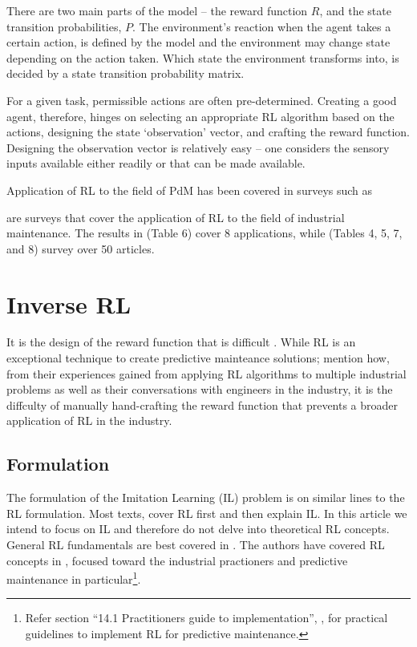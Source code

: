 \documentclass{article}
\begin{document}
There are two main parts of the model -- the reward function $R$, and the state transition probabilities, $P$. The environment's reaction when the agent takes a certain action, is defined by the model and the environment may change state depending on the action taken. Which state the environment transforms into, is decided by a state transition probability matrix. 

For a given task, permissible actions are often pre-determined. Creating a good agent, therefore, hinges on selecting an appropriate RL algorithm based on the actions, designing the state `observation' vector, and crafting the reward function. Designing the observation vector is relatively easy -- one considers the sensory inputs available either readily or that can be made available. 

Application of RL to the field of PdM has been covered in surveys such as \cite{Erhan2021Smart, Ren2021, Barja-Martinez2021, panzer2022, siraskar2023}

\cite{panzer2022, siraskar2023} are surveys that cover the application of RL to the field of industrial maintenance. The results in \cite{panzer2022} (Table 6) cover 8 applications, while \cite{siraskar2023} (Tables 4, 5, 7, and 8) survey over 50 articles. 

\section{Inverse RL}

It is the design of the reward function that is difficult \citep{abbeel2004apprenticeship, ng2000algorithms}.
While RL is an exceptional technique to create predictive mainteance solutions; \cite{abbeel2004apprenticeship} mention how, from their experiences gained from applying RL algorithms to multiple industrial problems as well as their conversations with engineers in the industry, it is the diffculty of manually hand-crafting the reward function that prevents a broader application of RL in the industry.

\subsection{Formulation} 

The formulation of the Imitation Learning (IL) problem is on similar lines to the RL formulation. Most texts, cover RL first and then explain IL. In this article we intend to focus on IL and therefore do not delve into theoretical RL concepts. General RL fundamentals are best covered in \citep{sutton2018, stanford-lectures}. The authors have covered RL concepts in \cite{siraskar2023}, focused toward the industrial practioners and predictive maintenance in particular\footnote{Refer section ``14.1 Practitioners guide to implementation'', \citep{siraskar2023}, for practical guidelines to implement RL for predictive maintenance.}.  
\end{document}
